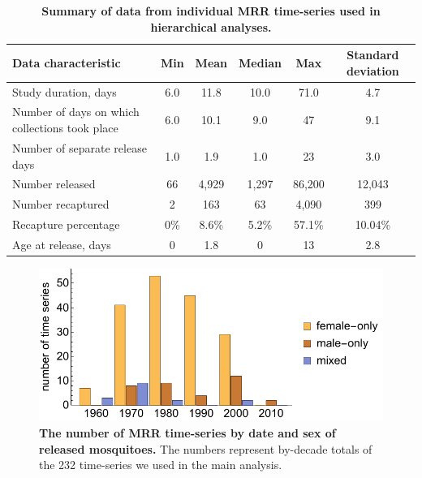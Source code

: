 \documentclass[12pt]{article}
\begin{document}
\begin{table}[htbp]
	\centering
	\footnotesize
	\begin{adjustwidth}{-0.5in}{-0.5in}%
		\begin{tabularx}{1.25\textwidth}{l|ccccc}
			\toprule
			\textbf{Data characteristic} & \textbf{Min} & \textbf{Mean} & \textbf{Median} & \textbf{Max} & \textbf{Standard deviation} \\
			\midrule
			Study duration, days & 6.0   & 11.8  & 10.0  & 71.0    & 4.7 \\
			Number of days on which collections took place & 6.0   & 10.1  & 9.0   & 47    & 9.1 \\
			Number of separate release days & 1.0     & 1.9   & 1.0     & 23    & 3.0 \\
			Number released & 66    & 4,929  & 1,297  & 86,200 & 12,043 \\
			Number recaptured & 2     & 163   & 63    & 4,090  & 399 \\
			Recapture percentage & 0\% & 8.6\% & 5.2\% & 57.1\% & 10.04\% \\
			Age at release, days & 0   & 1.8   & 0   & 13    & 2.8 \\
			\bottomrule
		\end{tabularx}%
		\caption{\textbf{Summary of data from individual MRR time-series used in hierarchical analyses.}}
		\label{tab:mrr_IndividualData}%
	\end{adjustwidth}
\end{table}%

\begin{figure}[h]
	\centerline{\includegraphics[width=1\textwidth]{./Figure_files/mrr_sexReleasesOverTime.pdf}}
	\caption{\textbf{The number of MRR time-series by date and sex of released mosquitoes.} The numbers represent by-decade totals of the 232 time-series we used in the main analysis.}
	\label{fig:mrr_sexReleasesOverTime}
\end{figure}
\end{document}
